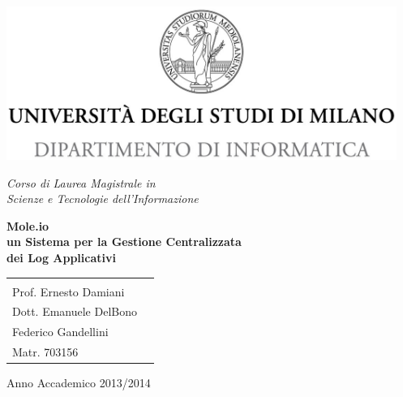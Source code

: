 \begin{titlepage}
  \begin{center}
    \includegraphics[height=5.0cm]{img/minerva_2013_DI.jpg}
    
    \vspace*{.4cm}
    {\Large 
      \emph{Corso di Laurea Magistrale in\\[.3cm]
        Scienze e Tecnologie dell'Informazione}
    }
    \vfill
    \begin{LARGE}
      \textbf{Mole.io\\[0.4cm]
        un Sistema per la Gestione Centralizzata\\[0.6cm]
        dei Log Applicativi}
    \end{LARGE}
    
    \vfill
    \begin{minipage}{.99\linewidth}
      \begin{tabular}{l r}
        \begin{minipage}{.4\linewidth}
          \begin{flushleft}
            {\large
              RELATORE\\[.3cm]
              Prof. Ernesto Damiani
            }
            
            \vspace*{1.5cm}
            {\large
              CORRELATORE\\[.3cm]
              Dott. Emanuele DelBono
            }
          \end{flushleft}
        \end{minipage}
        &
        \begin{minipage}{.6\linewidth}
          \begin{flushright}
            {\large
              TESI DI LAUREA DI\\[.3cm]
              Federico Gandellini\\[.45cm]
              Matr. 703156
            }
          \end{flushright}
        \end{minipage}
      \end{tabular}
    \end{minipage}
    
    \vfill
    {\large{{Anno Accademico 2013/2014}}}
  \end{center}
\end{titlepage}
